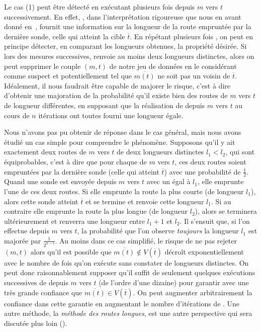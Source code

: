 Le cas (1) peut être détecté en exécutant plusieurs fois \traceroute depuis $m$
vers $t$ successivement. En effet, \traceroute, dans l'interprétation rigoureuse
que nous en avant donné en~, fournit une information
sur la longueur de la route empruntée par la dernière sonde, celle qui atteint
la cible $\overline{t}$. En répétant plusieurs fois \traceroute, on peut en
principe détecter, en comparant les longueurs obtenues, la propriété désirée. Si
lors des mesures successives, \traceroute renvoie au moins deux longueurs
distinctes, alors on peut supprimer le couple $(m, t)$ de notre jeu de données
en le considérant comme suspect et potentiellement tel que $\overline{m(t)}$ ne
soit pas un voisin de $\overline{t}$. Idéalement, il nous faudrait être capable
de majorer le risque, c'est à dire d'obtenir une majoration de la probabilité
qu'il existe bien des routes de $m$ vers $t$ de longueur différentes, en
supposant que la réalisation de \traceroute depuis $m$ vers $t$ au cours de $n$
itérations ont toutes fourni une longueur égale.

Nous n'avons pas pu obtenir de réponse dans le cas général, mais nous avons
étudié un cas simple pour comprendre le phénomène. Supposons qu'il y ait
exactement deux routes de $m$ vers $t$ de deux longueurs distinctes $l_1 < l_2$,
qui sont équiprobables, c'est à dire que pour chaque \traceroute de $m$ vers
$t$, ces deux routes soient empruntées par la dernière sonde (celle qui atteint
$\overline{t}$) avec une probabilité de $\frac{1}{2}$. Quand une sonde
\traceroute est envoyée depuis $m$ vers $t$ avec un \ttl égal à $l_1$,
elle emprunte l'une de ces deux routes. Si elle emprunte la route la plus courte
(de longueur $l_1$), alors cette sonde atteint $\overline{t}$ et \traceroute se
termine et renvoie cette longueur $l_1$. Si au contraire elle emprunte la route
la plus longue (de longueur $l_2$), alors \traceroute se terminera
ultérieurement et renverra une longueur entre $l_1 + 1$ et $l_2$. Il s'ensuit
que, si l'on effectue \traceroute depuis $m$ vers $t$, la probabilité que l'on observe {\em
toujours} la longueur $l_1$ est majorée par $\frac{1}{2^{n-1}}$. Au moins dans
ce cas simplifié, le risque de ne pas rejeter $(m, t)$ alors qu'il est possible
que $\overline{m(t)} \notin V(\overline{t})$ décroît exponentiellement avec le
nombre de fois qu'on exécute \traceroute sans constater de longueurs distinctes.
On peut donc raisonnablement supposer qu'il suffit de seulement quelques
exécutions successives de \traceroute depuis $m$ vers $t$ (de l'ordre d'une
dizaine) pour garantir avec une très grande confiance que $\overline{m(t)} \in
V(\overline{t})$. On peut augmenter arbitrairement la confiance dans cette
garantie en augmentant le nombre d'itérations de \traceroute. Une autre méthode,
la {\em méthode des routes longues}, est une autre perspective qui sera discutée
plus loin ().

